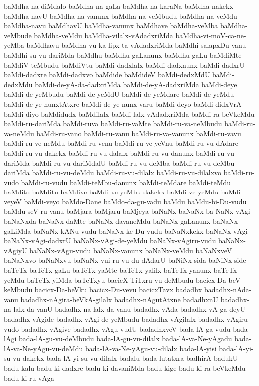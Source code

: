 {baMdha-na-diMdalo
baMdha-na-gaLa
baMdha-na-karaNa
baMdha-nakekx
baMdha-navU
baMdha-na-vanunx
baMdha-na-veMbudu
baMdha-na-veMdu
baMdha-navu
baMdhavU
baMdha-vanunx
baMdhave
baMdha-veMba
baMdha-veMbude
baMdha-veMdu
baMdha-vilalx-vAdadxriMda
baMdha-vi-moV-ca-ne-yeMba
baMdhavu
baMdha-vu-ka-lipx-ta-vAdadxriMda
baMdhi-salapxDu-vanu
baMdhi-su-vu-dariMda
baMdhu
baMdhu-gaLanunx
baMdhu-gaLu
baMdiMte
baMdiV-teMbudu
baMdiVtu
baMdi-dadxlalx
baMdi-dadxnunx
baMdi-dadxrU
baMdi-dadxre
baMdi-dadxvo
baMdide
baMdideV
baMdi-dedxMdU
baMdi-dedxMdu
baMdi-de-yA-da-dadxriMda
baMdi-de-yA-dadxriMda
baMdi-deye
baMdi-de-yeMbudu
baMdi-de-yeMdU
baMdi-de-yeMdare
baMdi-de-yeMdu
baMdi-de-ye-nunxtAtxre
baMdi-de-ye-nunx-varu
baMdi-deyo
baMdi-didxVrA
baMdi-diyo
baMdidudx
baMdilalx
baMdi-lalx-vAdadxriMda
baMdi-ra-beVkeMdu
baMdi-ru-dariMda
baMdi-ruva
baMdi-ru-vaMte
baMdi-ru-va-neMbudu
baMdi-ru-va-neMdu
baMdi-ru-vano
baMdi-ru-vanu
baMdi-ru-va-vanunx
baMdi-ru-vavu
baMdi-ru-ve-neMdu
baMdi-ru-venu
baMdi-ru-ve-yeVnu
baMdi-ru-vu-dAdare
baMdi-ru-vu-dakekx
baMdi-ru-vu-dalalx
baMdi-ru-vu-danunx
baMdi-ru-vu-dariMda
baMdi-ru-vu-dariMdalU
baMdi-ru-vu-deMba
baMdi-ru-vu-deMbu-dariMda
baMdi-ru-vu-deMdu
baMdi-ru-vu-dilalx
baMdi-ru-vu-dilalxvo
baMdi-ru-vudo
baMdi-ru-vudu
baMdi-teMbu-danunx
baMdi-teMdare
baMdi-teMdu
baMdito
baMditu
baMdive
baMdi-ve-yeMbu-dakekx
baMdi-ve-yeMdu
baMdi-veyeV
baMdi-veyo
baMdo-Dane
baMdo-da-gu-vadu
baMdu
baMdu-bi-Du-vudu
baMdu-seV-ru-vanu
baMjara
baMjaru
baMjeya
baNaNx
baNaNx-ba-NaNx-vAgi
baNaNxda
baNaNx-daMte
baNaNx-davaneMdu
baNaNx-gaLanunx
baNaNx-gaLiMda
baNaNx-kANu-vudu
baNaNx-ke-Du-vudu
baNaNxkekx
baNaNx-vAgi
baNaNx-vAgi-dadxrU
baNaNx-vAgi-de-yeMdu
baNaNx-vAgiru-vudu
baNaNx-vAgiyU
baNaNx-vAgu-vudu
baNaNx-vanunx
baNaNx-veMdu
baNaNxveV
baNaNxvo
baNaNxvu
baNaNx-vui-ru-vu-du-dAdarU
baNiNx-sida
baNiNx-side
baTeTx
baTeTx-gaLu
baTeTx-yaMte
baTeTx-yalilx
baTeTx-yanunx
baTeTx-yeMdu
baTeTx-yiMda
baTeTxyu
bacicX-TiTxru-vu-deMbudu
bacicx-Da-beV-keMbudu
bacicx-Da-beVku
bacicx-Du-vevu
bacicxTavx
badadhx
badadhx-nAda-vanu
badadhx-nAgira-beVkA-gilalx
badadhx-nAgutAtxne
badadhxnU
badadhx-na-lalx-da-vanU
badadhx-na-lalx-da-vanu
badadhx-vAda
badadhx-vA-ga-deyU
badadhx-vAgide
badadhx-vAgi-de-yeMbudu
badadhx-vAgilalx
badadhx-vAgiru-vudo
badadhx-vAgive
badadhx-vAgu-vudU
badadhxveV
bada-lA-ga-vudu
bada-lAgi
bada-lA-gu-vu-deMbudu
bada-lA-gu-vu-dilalx
bada-lA-va-Ne-yAgadu
bada-lA-va-Ne-yAgu-vu-deMdu
bada-lA-va-Ne-yAgu-vu-dilalx
bada-lA-yisi
bada-lA-yi-su-vu-dakekx
bada-lA-yi-su-vu-dilalx
badalu
bada-lutatxra
badhirA
badukU
badu-kalu
badu-ki-dadxre
badu-ki-davaniMda
badu-kige
badu-ki-ra-beVkeMdu
badu-ki-ru-vAga
}
